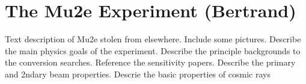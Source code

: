 \section {The Mu2e Experiment (Bertrand)}
\label{subsec:mu2e}
Text description of Mu2e stolen from elsewhere.  Include some pictures.
Describe the main physics goals of the experiment.
Describe the principle backgrounds to the conversion searches.  Reference the sensitivity papers.
Describe the primary and 2ndary beam properties.
Descrie the basic properties of cosmic rays


